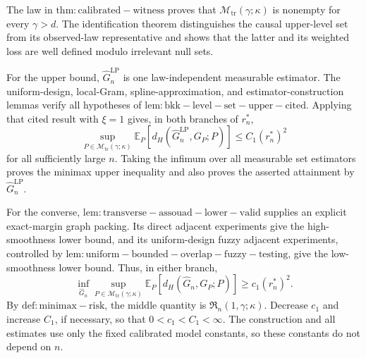 The law in \(\mathrm{thm:calibrated-witness}\) proves that \(\mathcal M_{\mathrm{tr}}(\gamma;\kappa)\) is nonempty for every \(\gamma>d\). The identification theorem distinguishes the causal upper-level set from its observed-law representative and shows that the latter and its weighted loss are well defined modulo irrelevant null sets.

For the upper bound, \(\widehat G_n^{\mathrm{LP}}\) is one law-independent measurable estimator. The uniform-design, local-Gram, spline-approximation, and estimator-construction lemmas verify all hypotheses of \(\mathrm{lem:bkk-level-set-upper-cited}\). Applying that cited result with \(\xi=1\) gives, in both branches of \(r_n^*\),
\[
 \sup_{P\in\mathcal M_{\mathrm{tr}}(\gamma;\kappa)}
 \mathbb E_P[d_H(\widehat G_n^{\mathrm{LP}},G_P;P)]
 \le C_1(r_n^*)^2
\]
for all sufficiently large \(n\). Taking the infimum over all measurable set estimators proves the minimax upper inequality and also proves the asserted attainment by \(\widehat G_n^{\mathrm{LP}}\).

For the converse, \(\mathrm{lem:transverse-assouad-lower-valid}\) supplies an explicit exact-margin graph packing. Its direct adjacent experiments give the high-smoothness lower bound, and its uniform-design fuzzy adjacent experiments, controlled by \(\mathrm{lem:uniform-bounded-overlap-fuzzy-testing}\), give the low-smoothness lower bound. Thus, in either branch,
\[
 \inf_{\widehat G_n}
 \sup_{P\in\mathcal M_{\mathrm{tr}}(\gamma;\kappa)}
 \mathbb E_P[d_H(\widehat G_n,G_P;P)]
 \ge c_1(r_n^*)^2.
\]
By \(\mathrm{def:minimax-risk}\), the middle quantity is \(\mathfrak R_n(1,\gamma;\kappa)\). Decrease \(c_1\) and increase \(C_1\), if necessary, so that \(0<c_1<C_1<\infty\). The construction and all estimates use only the fixed calibrated model constants, so these constants do not depend on \(n\).